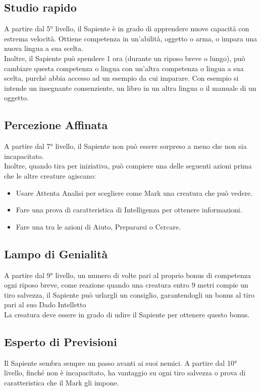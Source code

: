 \subsection{Studio rapido}
A partire dal 5° livello, il Sapiente è in grado di apprendere nuove capacità con estrema velocità. Ottiene competenza in un'abilità, oggetto o arma, o impara una nuova lingua a sua scelta. \\
Inoltre, il Sapiente può spendere 1 ora (durante un riposo breve o lungo), può cambiare questa competenza o lingua con un'altra competenza o lingua a sua scelta, purché abbia accesso ad un esempio da cui imparare. Con esempio si intende un insegnante consenziente, un libro in un altra lingua o il manuale di un oggetto.

\subsection{Percezione Affinata}
A partire dal 7° livello, il Sapiente non può essere sorpreso a meno che non sia incapacitato.\\
Inoltre, quando tira per iniziativa, può compiere una delle seguenti azioni prima che le altre creature agiscano:
\begin{itemize}
    \item Usare Attenta Analisi per scegliere come Mark una creatura che può vedere.
    \item Fare una prova di caratteristica di Intelligenza per ottenere informazioni.
    \item Fare una tra le azioni di Aiuto,  Prepararsi o Cercare.
\end{itemize}

\subsection{Lampo di Genialità}
A partire dal 9° livello, un numero di volte pari al proprio bonus di competenza ogni riposo breve, come reazione quando una creatura entro 9 metri compie un tiro salvezza, il Sapiente può urlargli un consiglio, garantendogli un bonus al tiro pari al suo Dado Intelletto\\
La creatura deve essere in grado di udire il Sapiente per ottenere questo bonus.

\subsection{Esperto di Previsioni}
Il Sapiente sembra sempre un passo avanti ai suoi nemici. A partire dal 10° livello, finché non è incapacitato, ha vantaggio su ogni tiro salvezza o prova di caratteristica che il Mark gli impone.


